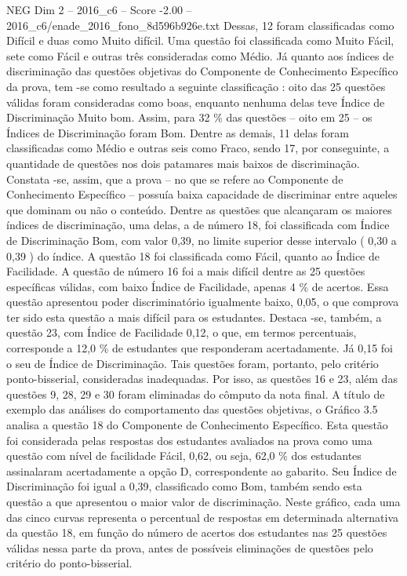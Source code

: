 \begin{textsample}{NEG Dim 2 – 2016\_c6 – Score -2.00 – 2016\_c6/enade\_2016\_fono\_8d596b926e.txt}
Dessas, 12 foram classificadas como Difícil e duas como Muito difícil.
Uma questão foi classificada como Muito Fácil, sete como Fácil e outras três consideradas como Médio.
Já quanto aos índices de discriminação das questões objetivas do Componente de Conhecimento Específico da prova, tem -se como resultado a seguinte classificação : oito das 25 questões válidas foram consideradas como boas, enquanto nenhuma delas teve Índice de Discriminação Muito bom.
Assim, para 32 \% das questões – oito em 25 – os Índices de Discriminação foram Bom.
Dentre as demais, 11 delas foram classificadas como Médio e outras seis como Fraco, sendo 17, por conseguinte, a quantidade de questões nos dois patamares mais baixos de discriminação.
Constata -se, assim, que a prova – no que se refere ao Componente de Conhecimento Específico – possuía baixa capacidade de discriminar entre aqueles que dominam ou não o conteúdo.
Dentre as questões que alcançaram os maiores índices de discriminação, uma delas, a de número 18, foi classificada com Índice de Discriminação Bom, com valor 0,39, no limite superior desse intervalo ( 0,30 a 0,39 ) do índice.
A questão 18 foi classificada como Fácil, quanto ao Índice de Facilidade.
A questão de número 16 foi a mais difícil dentre as 25 questões específicas válidas, com baixo Índice de Facilidade, apenas 4 \% de acertos.
Essa questão apresentou poder discriminatório igualmente baixo, 0,05, o que comprova ter sido esta questão a mais difícil para os estudantes.
Destaca -se, também, a questão 23, com Índice de Facilidade 0,12, o que, em termos percentuais, corresponde a 12,0 \% de estudantes que responderam acertadamente.
Já 0,15 foi o seu de Índice de Discriminação.
Tais questões foram, portanto, pelo critério ponto-bisserial, consideradas inadequadas.
Por isso, as questões 16 e 23, além das questões 9, 28, 29 e 30 foram eliminadas do cômputo da nota final.
A título de exemplo das análises do comportamento das questões objetivas, o Gráfico 3.5 analisa a questão 18 do Componente de Conhecimento Específico.
Esta questão foi considerada pelas respostas dos estudantes avaliados na prova como uma questão com nível de facilidade Fácil, 0,62, ou seja, 62,0 \% dos estudantes assinalaram acertadamente a opção D, correspondente ao gabarito.
Seu Índice de Discriminação foi igual a 0,39, classificado como Bom, também sendo esta questão a que apresentou o maior valor de discriminação.
Neste gráfico, cada uma das cinco curvas representa o percentual de respostas em determinada alternativa da questão 18, em função do número de acertos dos estudantes nas 25 questões válidas nessa parte da prova, antes de possíveis eliminações de questões pelo critério do ponto-bisserial.

\end{textsample}
